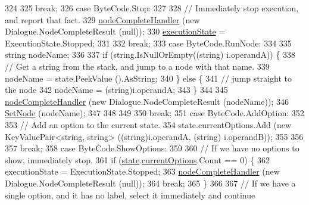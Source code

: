 \begin{DoxyCode}
324 
325                 \textcolor{keywordflow}{break};
326             \textcolor{keywordflow}{case} ByteCode.Stop:
327 
328                 \textcolor{comment}{// Immediately stop execution, and report that fact.}
329                 \hyperlink{a00086_a5129c63e67e2d4e2780d86b8351320a2}{nodeCompleteHandler} (\textcolor{keyword}{new} Dialogue.NodeCompleteResult (null));
330                 \hyperlink{a00086_a66491da06023dabfb63d09e6ccbba74f}{executionState} = ExecutionState.Stopped;
331 
332                 \textcolor{keywordflow}{break};
333             \textcolor{keywordflow}{case} ByteCode.RunNode:
334 
335                 \textcolor{keywordtype}{string} nodeName;
336 
337                 \textcolor{keywordflow}{if} (\textcolor{keywordtype}{string}.IsNullOrEmpty((\textcolor{keywordtype}{string}) i.operandA)) \{
338                     \textcolor{comment}{// Get a string from the stack, and jump to a node with that name.}
339                      nodeName = state.PeekValue ().AsString;
340                 \} \textcolor{keywordflow}{else} \{
341                     \textcolor{comment}{// jump straight to the node}
342                     nodeName = (string)i.operandA;
343                 \}
344 
345                 \hyperlink{a00086_a5129c63e67e2d4e2780d86b8351320a2}{nodeCompleteHandler} (\textcolor{keyword}{new} Dialogue.NodeCompleteResult (nodeName));
346                 \hyperlink{a00086_a6364593ea1115d65e34b343422cfbbbd}{SetNode} (nodeName);
347 
348 
349 
350                 \textcolor{keywordflow}{break};
351             \textcolor{keywordflow}{case} ByteCode.AddOption:
352 
353                 \textcolor{comment}{// Add an option to the current state.}
354                 state.currentOptions.Add (\textcolor{keyword}{new} KeyValuePair<string, string> ((string)i.operandA, (\textcolor{keywordtype}{string})
      i.operandB));
355 
356 
357                 \textcolor{keywordflow}{break};
358             \textcolor{keywordflow}{case} ByteCode.ShowOptions:
359 
360                 \textcolor{comment}{// If we have no options to show, immediately stop.}
361                 \textcolor{keywordflow}{if} (\hyperlink{a00086_a70f2ce6201cdd2430ceaa764ac614ca0}{state}.\hyperlink{a00089_ab816dfea32ecda23282700f01454e0a9}{currentOptions}.Count == 0) \{
362                     executionState = ExecutionState.Stopped;
363                     \hyperlink{a00086_a5129c63e67e2d4e2780d86b8351320a2}{nodeCompleteHandler} (\textcolor{keyword}{new} Dialogue.NodeCompleteResult (null));
364                     \textcolor{keywordflow}{break};
365                 \}
366 
367                 \textcolor{comment}{// If we have a single option, and it has no label, select it immediately and continue}

\end{DoxyCode}
